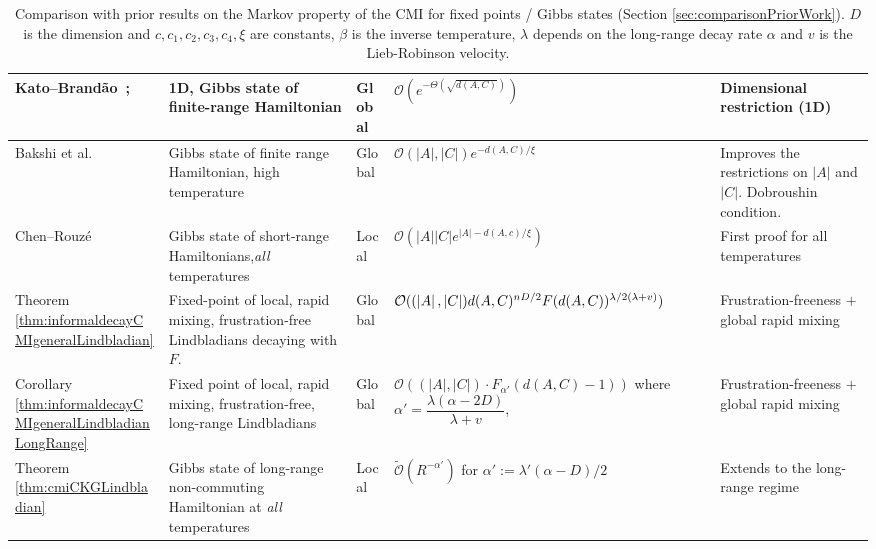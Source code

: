 \documentclass[11pt]{article}
\numberwithin{equation}{section}
\numberwithin{figure}{section}
\numberwithin{table}{section}
\theoremstyle{definition}
\theoremstyle{plain}
\theoremstyle{remark}
\newcommand{\abs}[1]{\left \vert#1\right\vert}
\begin{document}
\begin{table}[t!]
\begin{tabular}{|p{2.2cm}|p{3.2cm}|p{1.2cm}|p{4.5cm}|p{3cm}|}
\hline
Kato--Brandão~\cite{Kato2019}; 
&
1D, Gibbs state of finite-range Hamiltonian
&
Global
&
$\mathcal{O}(e^{-\Theta (\sqrt{d(A,C)})})$
&
Dimensional restriction (1D)
\\
\hline
Bakshi et al. ~\cite{bakshi_dobrushin_2025}
&
Gibbs state of finite range Hamiltonian, \newline high temperature
&
Global
&
$\mathcal{O}(\abs{A},\abs{C})e^{-d(A,C)/\xi}$
&
Improves the restrictions on $\abs{A}$ and $\abs{C}$. Dobroushin condition.
\\
\hline
Chen--Rouzé \cite{chen_quantum_2025}
&
Gibbs state of short-range Hamiltonians,\newline \textit{all} temperatures
&
Local
&
$\mathcal{O}(\abs{A}\abs{C} e^{\abs{A}-d(A,c)/\xi})$
&
First proof for all temperatures
\\
\hline
Theorem \ref{thm:informaldecayCMIgeneralLindbladian}
&
Fixed-point of local, rapid mixing, frustration-free Lindbladians decaying with $F$.
&
Global
&
$\mathcal{O}((\abs{A},\abs{C})\newline d(A,C)^{nD/2} F(d(A,C))^{\lambda/2(\lambda+v)})$
&
Frustration-freeness $+$ global rapid mixing
\\
\hline
Corollary \ref{thm:informaldecayCMIgeneralLindbladianLongRange}
&
Fixed point of local, rapid mixing, frustration-free, long-range Lindbladians
&
Global
&
$\mathcal{O}((\abs{A},\abs{C}) \cdot F_{\alpha '}(d(A,C)-1))$\newline
     where $\alpha'=\dfrac{\lambda(\alpha-2D)}{\lambda +v}$,
&
Frustration-freeness $+$ global rapid mixing
\\
\hline
Theorem \ref{thm:cmiCKGLindbladian}
&
Gibbs state of long-range non-commuting Hamiltonian at \textit{all} temperatures
&
Local
&
$\tilde{\mathcal{O}}(R^{-\alpha'})$\newline
    for $\alpha':=\lambda ' (\alpha-D)/2$
&
Extends \cite{chen_quantum_2025} to the long-range regime
\\
\hline
\end{tabular}
\caption{Comparison with prior results on the Markov property of the CMI for
fixed points / Gibbs states (Section \ref{sec:comparisonPriorWork}). $D$ is the dimension and $c,c_1,c_2,c_3,c_4,\xi$ are constants, $\beta$ is the inverse temperature, $\lambda$ depends on the long-range decay rate $\alpha$ and $v$ is the Lieb-Robinson velocity.}
\label{tab:priorWorkCMI}
\end{table}

\end{document}
